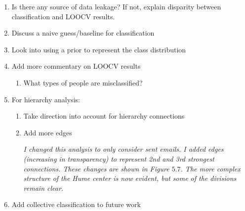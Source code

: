 \documentclass[12pt]{report}
\begin{document}
\begin{enumerate}
    \item Is there any source of data leakage? If not, explain disparity between classification and LOOCV results.

    \item Discuss a naive guess/baseline for classification

    \item Look into using a prior to represent the class distribution

	\item Add more commentary on LOOCV results
    \begin{enumerate}
		\item What types of people are misclassified?
    \end{enumerate}
    
	\item For hierarchy analysis:
	\begin{enumerate}
		\item Take direction into account for hierarchy connections
		\item Add more edges
		
		\par \textit{I changed this analysis to only consider sent emails.  I added edges (increasing in transparency) to represent 2nd and 3rd strongest connections. These changes are shown in Figure $5.7$.  The more complex structure of the Hume center is now evident, but some of the divisions remain clear.}
	\end{enumerate}

	\item Add collective classification to future work
\end{enumerate}
\end{document}
